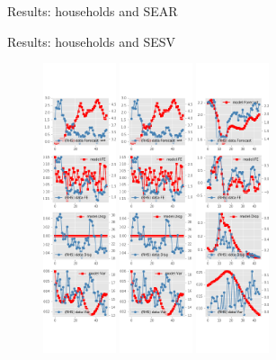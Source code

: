 \documentclass{beamer}
\begin{document}
\begin{frame}{Results: households and SEAR}
\begin{frame}{Results: households and SESV}
\begin{figure}[ht]
			\includegraphics[width=0.19\textwidth, height = \0.95\textheight]{figures/sce_se_est_sv_diag2.png}
			\includegraphics[width=0.19\textwidth, height = \0.95\textheight]{figures/sce_se_est_sv_diag3.png}
			\includegraphics[width=0.19\textwidth, height = \0.95\textheight]{figures/spf_se_est_sv_diag4.png}

\end{figure}
\end{frame}
\end{frame}
\end{document}
